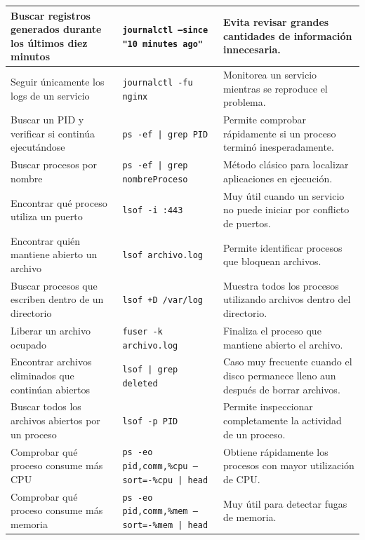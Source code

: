 \documentclass[a4paper,10pt]{article}
\begin{document}
\begin{longtable}{|p{4.8cm}|p{7.5cm}|p{4cm}|}
Buscar registros generados durante los últimos diez minutos &
\texttt{journalctl --since "10 minutes ago"} &
Evita revisar grandes cantidades de información innecesaria.
\\
\hline

Seguir únicamente los logs de un servicio &
\texttt{journalctl -fu nginx} &
Monitorea un servicio mientras se reproduce el problema.
\\
\hline

Buscar un PID y verificar si continúa ejecutándose &
\texttt{ps -ef | grep PID} &
Permite comprobar rápidamente si un proceso terminó inesperadamente.
\\
\hline

Buscar procesos por nombre &
\texttt{ps -ef | grep nombreProceso} &
Método clásico para localizar aplicaciones en ejecución.
\\
\hline

Encontrar qué proceso utiliza un puerto &
\texttt{lsof -i :443} &
Muy útil cuando un servicio no puede iniciar por conflicto de puertos.
\\
\hline

Encontrar quién mantiene abierto un archivo &
\texttt{lsof archivo.log} &
Permite identificar procesos que bloquean archivos.
\\
\hline

Buscar procesos que escriben dentro de un directorio &
\texttt{lsof +D /var/log} &
Muestra todos los procesos utilizando archivos dentro del directorio.
\\
\hline

Liberar un archivo ocupado &
\texttt{fuser -k archivo.log} &
Finaliza el proceso que mantiene abierto el archivo.
\\
\hline

Encontrar archivos eliminados que continúan abiertos &
\texttt{lsof | grep deleted} &
Caso muy frecuente cuando el disco permanece lleno aun después de borrar archivos.
\\
\hline

Buscar todos los archivos abiertos por un proceso &
\texttt{lsof -p PID} &
Permite inspeccionar completamente la actividad de un proceso.
\\
\hline

Comprobar qué proceso consume más CPU &
\texttt{ps -eo pid,comm,\%cpu --sort=-\%cpu | head} &
Obtiene rápidamente los procesos con mayor utilización de CPU.
\\
\hline

Comprobar qué proceso consume más memoria &
\texttt{ps -eo pid,comm,\%mem --sort=-\%mem | head} &
Muy útil para detectar fugas de memoria.
\\
\hline


\end{longtable}
\end{document}
